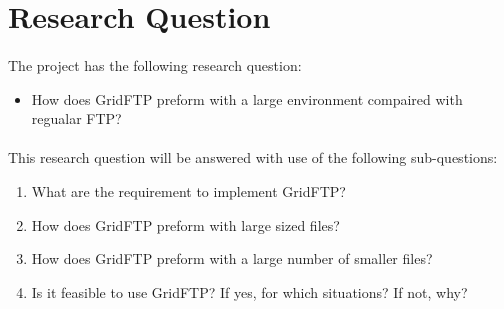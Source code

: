 \section{Research Question}
\paragraph{}
The project has the following research question:
\begin{itemize}
	\item How does GridFTP preform with a large environment compaired with regualar FTP?
\end{itemize}

\paragraph{}
This research question will be answered with use of the following sub-questions:
\begin{enumerate}
    \item What are the requirement to implement GridFTP?
    \item How does GridFTP preform with large sized files?
    \item How does GridFTP preform with a large number of smaller files?
    \item Is it feasible to use GridFTP? If yes, for which situations? If not, why?
\end{enumerate}


